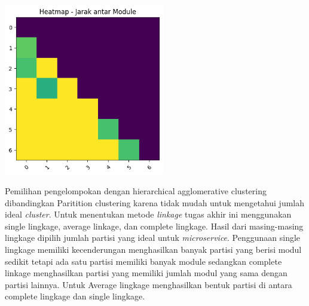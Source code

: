 \begin{center}
	\includegraphics[width=7cm]{img/bab_3/heatmap.png}
	\label{fig:asd}
\end{center}

Pemilihan pengelompokan dengan hierarchical agglomerative clustering dibandingkan Paritition clustering karena tidak mudah untuk mengetahui jumlah ideal \textit{cluster}. Untuk menentukan metode \textit{linkage} tugas akhir ini menggunakan single lingkage, average linkage, dan complete lingkage. Hasil dari masing-masing lingkage dipilih jumlah partisi yang ideal untuk \textit{microservice}. Penggunaan single lingkage memiliki kecenderungan menghasilkan banyak partisi yang berisi modul sedikit tetapi ada satu partisi memiliki banyak module sedangkan complete linkage menghasilkan partisi yang memiliki jumlah modul yang sama dengan partisi lainnya. Untuk Average lingkage menghasilkan bentuk partisi di antara complete lingkage dan single lingkage.

